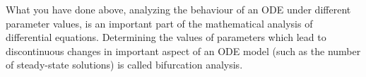 \documentclass{exam}
\begin{document}
\noindent What you have done above, analyzing the behaviour of an ODE under different parameter values, is an important part of the mathematical analysis of differential equations. Determining the values of parameters which lead to discontinuous changes in important aspect of an ODE model (such as the number of steady-state solutions) is called bifurcation analysis.
\end{document}
